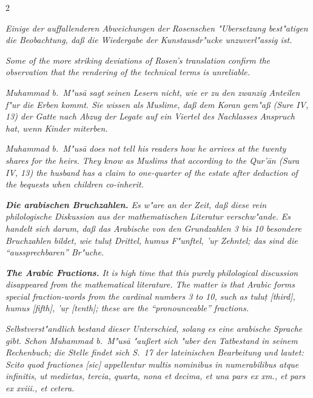 \documentclass[10pt,a4paper]{article}
\newcommand{\s}[1]{\d{#1}}
\newcommand{\enquote}[1]{``#1''}
\begin{document}
\begin{paracol}{2}
\switchcolumn*

\textit{Einige der auffallenderen Abweichungen der Rosenschen "Ubersetzung best"atigen die Beobachtung, da\ss{} die Wiedergabe der Kunstausdr"ucke unzuverl"assig ist.}

\switchcolumn

\textit{Some of the more striking deviations of Rosen's translation confirm the observation that the rendering of the technical terms is unreliable.}

\switchcolumn*

\textit{Muhammad b.\ M"us\=a sagt seinen Lesern nicht, wie er zu den zwanzig Anteilen f"ur die Erben kommt. Sie wissen als Muslime, da\ss{} dem Koran gem"a\ss{} (Sure IV, 13) der Gatte nach Abzug der Legate auf ein Viertel des Nachlasses Anspruch hat, wenn Kinder miterben.}

\switchcolumn

\textit{Muhammad b.\ M"us\=a does not tell his readers how he arrives at the twenty shares for the heirs. They know as Muslims that according to the Qur'\=an (Sura IV, 13) the husband has a claim to one-quarter of the estate after deduction of the bequests when children co-inherit.}

\switchcolumn*

\textit{\textbf{Die arabischen Bruchzahlen.} Es w"are an der Zeit, da\ss{} diese rein philologische Diskussion aus der mathematischen Literatur verschw"ande. Es handelt sich darum, da\ss{} das Arabische von den Grundzahlen 3 bis 10 besondere Bruchzahlen bildet, wie \textit{tulu\d{t}} Drittel, \textit{humus} F"unftel, \textit{'u\s{r}} Zehntel; das sind die \enquote{aussprechbaren} Br"uche.}

\switchcolumn

\textit{\textbf{The Arabic Fractions.} It is high time that this purely philological discussion disappeared from the mathematical literature. The matter is that Arabic forms special fraction-words from the cardinal numbers 3 to 10, such as \textit{tulu\d{t}} [third], \textit{humus} [fifth], \textit{'u\s{r}} [tenth]; these are the \enquote{pronounceable} fractions.}

\switchcolumn*

\textit{Selbstverst"andlich bestand dieser Unterschied, solang es eine arabische Sprache gibt. Schon Muhammad b.\ M"us\=a "au\ss{}ert sich "uber den Tatbestand in seinem Rechenbuch; die Stelle findet sich S.\ 17 der lateinischen Bearbeitung und lautet: \textit{Scito quod fractiones [sic] appellentur multis nominibus in numerabilibus atque infinitis, ut medietas, tercia, quarta, nona et decima, et una pars ex xm., et pars ex xviii., et cetera.}}


\end{paracol}
\end{document}
